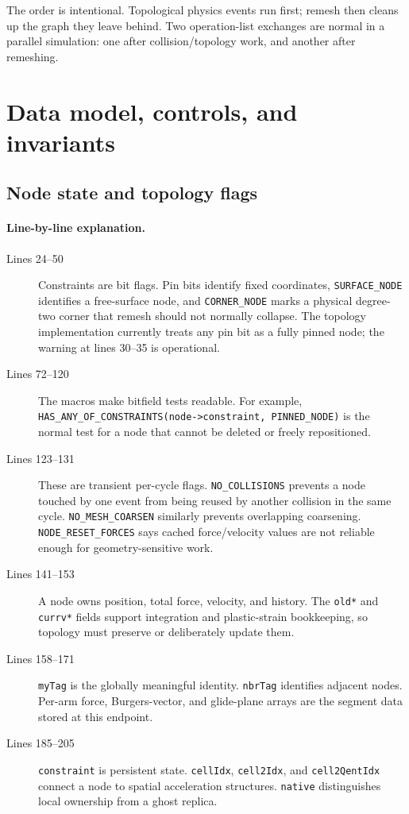 \documentclass[11pt]{article}
\newcommand{\code}[1]{\texorpdfstring{\nolinkurl{#1}}{#1}}
\begin{document}
The order is intentional. Topological physics events run first; remesh then
cleans up the graph they leave behind. Two operation-list exchanges are normal
in a parallel simulation: one after collision/topology work, and another
after remeshing.

\section{Data model, controls, and invariants}

\subsection{Node state and topology flags}



\paragraph{Line-by-line explanation.}
\begin{description}
\item[Lines 24--50] Constraints are bit flags. Pin bits identify fixed
coordinates, \code{SURFACE_NODE} identifies a free-surface node, and
\code{CORNER_NODE} marks a physical degree-two corner that remesh should not
normally collapse. The topology implementation currently treats any pin bit
as a fully pinned node; the warning at lines 30--35 is operational.
\item[Lines 72--120] The macros make bitfield tests readable. For example,
\code{HAS_ANY_OF_CONSTRAINTS(node->constraint, PINNED_NODE)} is the normal
test for a node that cannot be deleted or freely repositioned.
\item[Lines 123--131] These are transient per-cycle flags.
\code{NO_COLLISIONS} prevents a node touched by one event from being reused
by another collision in the same cycle. \code{NO_MESH_COARSEN} similarly
prevents overlapping coarsening. \code{NODE_RESET_FORCES} says cached
force/velocity values are not reliable enough for geometry-sensitive work.
\item[Lines 141--153] A node owns position, total force, velocity, and
history. The \code{old*} and \code{currv*} fields support integration and
plastic-strain bookkeeping, so topology must preserve or deliberately update
them.
\item[Lines 158--171] \code{myTag} is the globally meaningful identity.
\code{nbrTag} identifies adjacent nodes. Per-arm force, Burgers-vector, and
glide-plane arrays are the segment data stored at this endpoint.
\item[Lines 185--205] \code{constraint} is persistent state.
\code{cellIdx}, \code{cell2Idx}, and \code{cell2QentIdx} connect a node to
spatial acceleration structures. \code{native} distinguishes local ownership
from a ghost replica.
\end{description}
\end{document}
